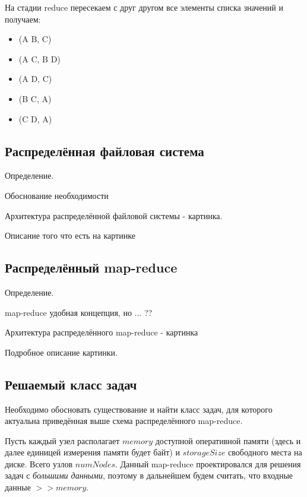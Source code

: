 \documentclass[12pt,a4paper,oneside]{extarticle}
\begin{document}
            На стадии reduce пересекаем с друг другом все элементы списка значений и получаем:

            \begin{itemize}
                \item (A B, C)
                \item (A C, B D)
                \item (A D, C)
                \item (B C, A)
                \item (C D, A)
            \end{itemize}
    \clearpage

    \subsection{Распределённая файловая система}
        Определение.

        Обоснование необходимости

        Архитектура распределённой файловой системы - картинка.

        Описание того что есть на картинке

    \clearpage
    \subsection{Распределённый map-reduce}
        Определение.

        map-reduce удобная концепция, но ... ??

        Архитектура распределённого map-reduce - картинка

        Подробное описание картинки.
        
    \clearpage

    \subsection{Решаемый класс задач}
    \label{sec:tasks}
        Необходимо обосновать существование и найти класс задач, для которого актуальна приведённая выше схема распределённого map-reduce.

        Пусть каждый узел располагает $memory$ доступной оперативной памяти (здесь и далее единицей измерения памяти будет байт) и $storageSize$ свободного места на диске. Всего узлов $numNodes$. Данный map-reduce проектировался для решения задач с {\it большими данными}, поэтому в дальнейшем будем считать, что входные данные $>>memory$. 
\end{document}
